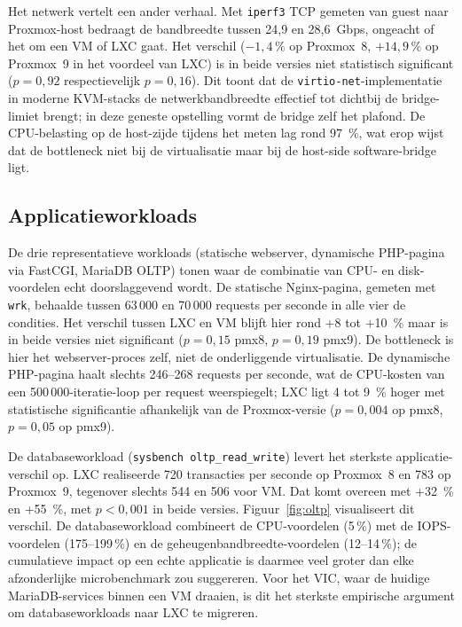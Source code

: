 Het netwerk vertelt een ander verhaal. Met \texttt{iperf3} TCP gemeten van guest naar Proxmox-host bedraagt de bandbreedte tussen 24,9 en 28,6~Gbps, ongeacht of het om een VM of LXC gaat. Het verschil ($-1,4\,\%$ op Proxmox~8, $+14,9\,\%$ op Proxmox~9 in het voordeel van LXC) is in beide versies niet statistisch significant ($p = 0,92$ respectievelijk $p = 0,16$). Dit toont dat de \texttt{virtio-net}-implementatie in moderne KVM-stacks de netwerkbandbreedte effectief tot dichtbij de bridge-limiet brengt; in deze geneste opstelling vormt de bridge zelf het plafond. De CPU-belasting op de host-zijde tijdens het meten lag rond 97~\%, wat erop wijst dat de bottleneck niet bij de virtualisatie maar bij de host-side software-bridge ligt.

\subsection{Applicatieworkloads}
De drie representatieve workloads (statische webserver, dynamische PHP-pagina via FastCGI, MariaDB OLTP) tonen waar de combinatie van CPU- en disk-voordelen echt doorslaggevend wordt. De statische Nginx-pagina, gemeten met \texttt{wrk}, behaalde tussen 63\,000 en 70\,000 requests per seconde in alle vier de condities. Het verschil tussen LXC en VM blijft hier rond +8 tot +10~\% maar is in beide versies niet significant ($p = 0,15$ pmx8, $p = 0,19$ pmx9). De bottleneck is hier het webserver-proces zelf, niet de onderliggende virtualisatie. De dynamische PHP-pagina haalt slechts 246--268 requests per seconde, wat de CPU-kosten van een 500\,000-iteratie-loop per request weerspiegelt; LXC ligt 4 tot 9~\% hoger met statistische significantie afhankelijk van de Proxmox-versie ($p = 0,004$ op pmx8, $p = 0,05$ op pmx9).

De databaseworkload (\texttt{sysbench oltp\_read\_write}) levert het sterkste applicatie-verschil op. LXC realiseerde 720 transacties per seconde op Proxmox~8 en 783 op Proxmox~9, tegenover slechts 544 en 506 voor VM. Dat komt overeen met +32~\% en +55~\%, met $p < 0,001$ in beide versies. Figuur~\ref{fig:oltp} visualiseert dit verschil. De databaseworkload combineert de CPU-voordelen (5\,\%) met de IOPS-voordelen (175--199\,\%) en de geheugenbandbreedte-voordelen (12--14\,\%); de cumulatieve impact op een echte applicatie is daarmee veel groter dan elke afzonderlijke microbenchmark zou suggereren. Voor het VIC, waar de huidige MariaDB-services binnen een VM draaien, is dit het sterkste empirische argument om databaseworkloads naar LXC te migreren.

